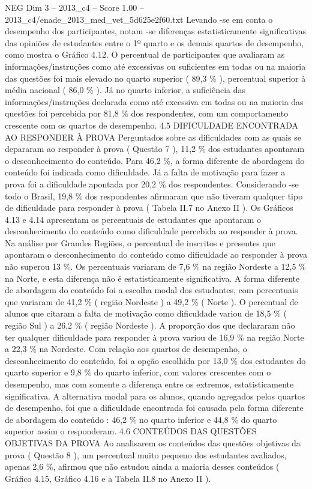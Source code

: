 \begin{textsample}{NEG Dim 3 – 2013\_c4 – Score 1.00 – 2013\_c4/enade\_2013\_med\_vet\_5d625e2f60.txt}
Levando -se em conta o desempenho dos participantes, notam -se diferenças estatisticamente significativas das opiniões de estudantes entre o 1º quarto e os demais quartos de desempenho, como mostra o Gráfico 4.12.
O percentual de participantes que avaliaram as informações/instruções como até excessivas ou suficientes em todas ou na maioria das questões foi mais elevado no quarto superior ( 89,3 \% ), percentual superior à média nacional ( 86,0 \% ).
Já no quarto inferior, a suficiência das informações/instruções declarada como até excessiva em todas ou na maioria das questões foi percebida por 81,8 \% dos respondentes, com um comportamento crescente com os quartos de desempenho. 4.5 DIFICULDADE ENCONTRADA AO RESPONDER À PROVA Perguntados sobre as dificuldades com as quais se depararam ao responder à prova ( Questão 7 ), 11,2 \% dos estudantes apontaram o desconhecimento do conteúdo.
Para 46,2 \%, a forma diferente de abordagem do conteúdo foi indicada como dificuldade.
Já a falta de motivação para fazer a prova foi a dificuldade apontada por 20,2 \% dos respondentes.
Considerando -se todo o Brasil, 19,8 \% dos respondentes afirmaram que não tiveram qualquer tipo de dificuldade para responder à prova ( Tabela II.7 no Anexo II ).
Os Gráficos 4.13 e 4.14 apresentam os percentuais de estudantes que apontaram o desconhecimento do conteúdo como dificuldade percebida ao responder à prova.
Na análise por Grandes Regiões, o percentual de inscritos e presentes que apontaram o desconhecimento do conteúdo como dificuldade ao responder à prova não superou 13 \%.
Os percentuais variaram de 7,6 \% na região Nordeste a 12,5 \% na Norte, e esta diferença não é estatisticamente significativa.
A forma diferente de abordagem do conteúdo foi a escolha modal dos estudantes, com percentuais que variaram de 41,2 \% ( região Nordeste ) a 49,2 \% ( Norte ).
O percentual de alunos que citaram a falta de motivação como dificuldade variou de 18,5 \% ( região Sul ) a 26,2 \% ( região Nordeste ).
A proporção dos que declararam não ter qualquer dificuldade para responder à prova variou de 16,9 \% na região Norte a 22,3 \% na Nordeste.
Com relação aos quartos de desempenho, o desconhecimento do conteúdo, foi a opção escolhida por 13,0 \% dos estudantes do quarto superior e 9,8 \% do quarto inferior, com valores crescentes com o desempenho, mas com somente a diferença entre os extremos, estatisticamente significativa.
A alternativa modal para os alunos, quando agregados pelos quartos de desempenho, foi que a dificuldade encontrada foi causada pela forma diferente de abordagem do conteúdo : 46,2 \% no quarto inferior e 44,8 \% do quarto superior assim o responderam. 4.6 CONTEÚDOS DAS QUESTÕES OBJETIVAS DA PROVA Ao analisarem os conteúdos das questões objetivas da prova ( Questão 8 ), um percentual muito pequeno dos estudantes avaliados, apenas 2,6 \%, afirmou que não estudou ainda a maioria desses conteúdos ( Gráfico 4.15, Gráfico 4.16 e a Tabela II.8 no Anexo II ).

\end{textsample}
